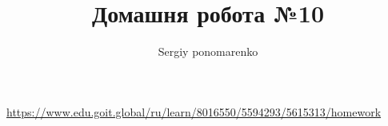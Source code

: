 \documentclass[14pt]{extarticle}
\title{Домашня робота №10}
\author{Sergiy ponomarenko}
\begin{document}
\maketitle

\begin{center}\scriptsize
\url{https://www.edu.goit.global/ru/learn/8016550/5594293/5615313/homework}
\end{center}

\inputminted[fontsize=\scriptsize,%
 numbersep = 1pt,%
 breaklines=true,%
 framesep=1mm,%
 baselinestretch=0.95,%
 bgcolor=gray!5,%
 fontsize=\footnotesize,%
 linenos]{python}{console_bot.py}
\end{document}
